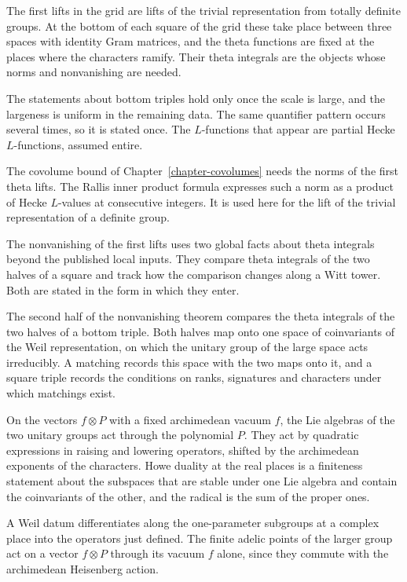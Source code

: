 The first lifts in the grid are lifts of the trivial representation from
totally definite groups. At the bottom of each square of the grid these take
place between three spaces with identity Gram matrices, and the theta
functions are fixed at the places where the characters ramify. Their theta
integrals are the objects whose norms and nonvanishing are needed.

The statements about bottom triples hold only once the scale is large, and the
largeness is uniform in the remaining data. The same quantifier pattern occurs
several times, so it is stated once. The $L$-functions that appear are partial
Hecke $L$-functions, assumed entire.

The covolume bound of Chapter~\ref{chapter-covolumes} needs the norms of the
first theta lifts. The Rallis inner product formula expresses such a norm as a
product of Hecke $L$-values at consecutive integers. It is used here for the
lift of the trivial representation of a definite group.

The nonvanishing of the first lifts uses two global facts about theta integrals
beyond the published local inputs. They compare theta integrals of the two
halves of a square and track how the comparison changes along a Witt tower.
Both are stated in the form in which they enter.

The second half of the nonvanishing theorem compares the theta integrals of
the two halves of a bottom triple. Both halves map onto one space of
coinvariants of the Weil representation, on which the unitary group of the
large space acts irreducibly. A matching records this space with the two maps
onto it, and a square triple records the conditions on ranks, signatures and
characters under which matchings exist.

On the vectors $f\otimes P$ with a fixed archimedean vacuum $f$, the Lie
algebras of the two unitary groups act through the polynomial $P$. They act by
quadratic expressions in raising and lowering operators, shifted by the
archimedean exponents of the characters. Howe duality at the real places is a
finiteness statement about the subspaces that are stable under one Lie algebra
and contain the coinvariants of the other, and the radical is the sum of the
proper ones.

A Weil datum differentiates along the one-parameter subgroups at a complex
place into the operators just defined. The finite adelic points of the larger
group act on a vector $f\otimes P$ through its vacuum $f$ alone, since they
commute with the archimedean Heisenberg action.

